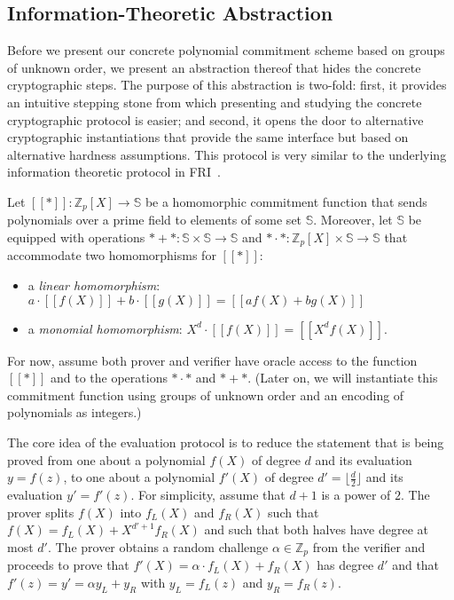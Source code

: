 \subsection{Information-Theoretic Abstraction}
\label{sec:abstraction}

Before we present our concrete polynomial commitment scheme based on groups of unknown order, we present an abstraction thereof that hides the concrete cryptographic steps. The purpose of this abstraction is two-fold: first, it provides an intuitive stepping stone from which presenting and studying the concrete cryptographic protocol is easier; and second, it opens the door to alternative cryptographic instantiations that provide the same interface but based on alternative hardness assumptions. This protocol is very similar to the underlying information theoretic protocol in FRI~\cite{ICALP:BBHR18}.

Let $[\![ * ]\!] : \mathbb{Z}_p[X] \rightarrow \mathbb{S}$ be a homomorphic commitment function that sends polynomials over a prime field to elements of some set $\mathbb{S}$. Moreover, let $\mathbb{S}$ be equipped with operations $* + * : \mathbb{S} \times \mathbb{S} \rightarrow \mathbb{S}$ and $ * \cdot * : \mathbb{Z}_p[X] \times \mathbb{S} \rightarrow \mathbb{S}$ that accommodate two homomorphisms for $[\![ * ]\!]$:
\begin{itemize}[nolistsep]
    \item a \emph{linear homomorphism}: $a \cdot [\![f(X)]\!] + b \cdot [\![g(X)]\!] = [\![af(X) + bg(X)]\!]$
    \item a \emph{monomial homomorphism}: $X^d \cdot [\![f(X)]\!] = [\![X^d f(X)]\!]$.
\end{itemize}
For now, assume both prover and verifier have oracle access to the function $[\![*]\!]$ and to the operations $ * \cdot *$ and $* + *$. (Later on, we will instantiate this commitment function using groups of unknown order and an encoding of polynomials as integers.)

The core idea of the evaluation protocol is to reduce the statement that is being proved from one about a polynomial $f(X)$ of degree $d$ and its evaluation $y = f(z)$, to one about a polynomial $f'(X)$ of degree $d'=\lfloor\frac{d}{2}\rfloor$ and its evaluation $y' = f'(z)$. For simplicity, assume that $d+1$ is a power of $2$.
The prover splits $f(X)$ into $f_L(X)$ and $f_R(X)$ such that $f(X) = f_L(X) + X^{d'+1} f_R(X)$ and such that both halves have degree at most $d'$. The prover obtains a random challenge $\alpha \in  \mathbb{Z}_p$ from the verifier and proceeds to prove that $f'(X)=\alpha \cdot f_L(X) + f_R(X)$ has degree $d'$ and that $f'(z) = y' = \alpha y_L + y_R$ with $y_L = f_L(z)$ and $y_R = f_R(z)$. 

